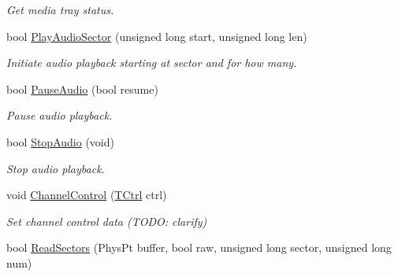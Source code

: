 \begin{DoxyCompactItemize}
\begin{DoxyCompactList}\small\item\em Get media tray status. \end{DoxyCompactList}\item 
\hypertarget{classCDROM__Interface__Image_afbb8b5443be56ba92b5a1287ba95f913}{bool \hyperlink{classCDROM__Interface__Image_afbb8b5443be56ba92b5a1287ba95f913}{Play\-Audio\-Sector} (unsigned long start, unsigned long len)}\label{classCDROM__Interface__Image_afbb8b5443be56ba92b5a1287ba95f913}

\begin{DoxyCompactList}\small\item\em Initiate audio playback starting at sector and for how many. \end{DoxyCompactList}\item 
\hypertarget{classCDROM__Interface__Image_ac74be8f64002ccf76b65c2fbd03077bd}{bool \hyperlink{classCDROM__Interface__Image_ac74be8f64002ccf76b65c2fbd03077bd}{Pause\-Audio} (bool resume)}\label{classCDROM__Interface__Image_ac74be8f64002ccf76b65c2fbd03077bd}

\begin{DoxyCompactList}\small\item\em Pause audio playback. \end{DoxyCompactList}\item 
\hypertarget{classCDROM__Interface__Image_a4a0af2e1be4fcb87e125b9d3e7aca327}{bool \hyperlink{classCDROM__Interface__Image_a4a0af2e1be4fcb87e125b9d3e7aca327}{Stop\-Audio} (void)}\label{classCDROM__Interface__Image_a4a0af2e1be4fcb87e125b9d3e7aca327}

\begin{DoxyCompactList}\small\item\em Stop audio playback. \end{DoxyCompactList}\item 
\hypertarget{classCDROM__Interface__Image_a6759cd7741be28cb61dd9903712edca1}{void \hyperlink{classCDROM__Interface__Image_a6759cd7741be28cb61dd9903712edca1}{Channel\-Control} (\hyperlink{structSCtrl}{T\-Ctrl} ctrl)}\label{classCDROM__Interface__Image_a6759cd7741be28cb61dd9903712edca1}

\begin{DoxyCompactList}\small\item\em Set channel control data (T\-O\-D\-O\-: clarify) \end{DoxyCompactList}\item 
\hypertarget{classCDROM__Interface__Image_a5121d2e82267d529bc462cecdac36791}{bool \hyperlink{classCDROM__Interface__Image_a5121d2e82267d529bc462cecdac36791}{Read\-Sectors} (Phys\-Pt buffer, bool raw, unsigned long sector, unsigned long num)}\label{classCDROM__Interface__Image_a5121d2e82267d529bc462cecdac36791}


\end{DoxyCompactItemize}
